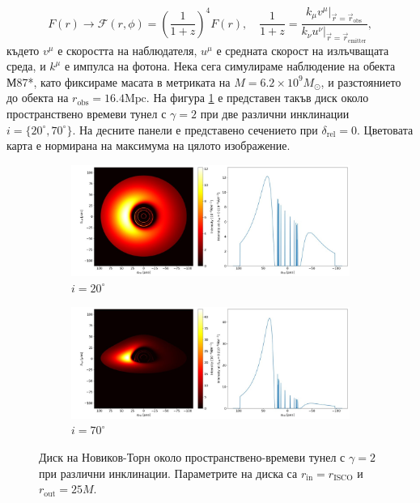 \documentclass[12pt]{article}
\numberwithin{equation}{section}
\numberwithin{figure}{section}
\begin{document}
	\begin{equation}
		F(r)\rightarrow\mathcal{F}(r,\phi) = \left(\frac{1}{1+z} \right)^4 F(r),\quad \frac{1}{1 + z} = \frac{k_\mu v^\mu\vert_{\vec{r} = \vec{r}_\text{obs}}}{k_\nu u^\nu\vert_{\vec{r} = \vec{r}_\text{emitter}}},
	\end{equation}
	където $v^\mu$ е скоростта на наблюдателя, $u^\mu$ е средната скорост на излъчващата среда, и $k^\mu$ е импулса на фотона. Нека сега симулираме наблюдение на обекта М87*, като фиксираме масата в метриката на $M = 6.2\times10^9 M_\odot$, и разстоянието до обекта на $r_\text{obs} = 16.4 \text{Mpc}$. На фигура \ref{WH_NT} е представен такъв диск около пространствено времеви тунел с $\gamma = 2$ при две различни инклинации $i=\{20^\circ, 70^\circ\}$. На десните панели е представено сечението при $\delta_\text{rel} = 0$. Цветовата карта е нормирана на максимума на цялото изображение. \\
	
	\begin{figure}[!htb]
		\centering
		\begin{subfigure}{12cm}
			\hspace{-0.6cm}
			\includegraphics[scale = 0.4]{Section_6_Morphology_of_the images_of_horizonless_spacetimes/WH_NT_Gamma2_20_deg.jpg}
			\caption{$i = 20^\circ$} 
		\end{subfigure}
		\begin{subfigure}{12cm}
			\hspace{-0.6cm}
			\includegraphics[scale = 0.4]{Section_6_Morphology_of_the images_of_horizonless_spacetimes/WH_NT_Gamma2_70_deg.jpg}
			\caption{$i = 70^\circ$} 
		\end{subfigure}
		\caption[Диск на Новиков-Торн около пространствено-времеви тунел при различни инклинации.]{\small Диск на Новиков-Торн около пространствено-времеви тунел с $\gamma = 2$ при различни инклинации. Параметрите на диска са $r_\text{in} = r_\text{ISCO}$ и $r_\text{out} = 25M$.} 
		\label{WH_NT}
	\end{figure}
	
\end{document}
